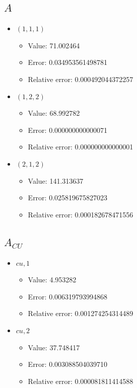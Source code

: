 \documentclass{article}%
\begin{document}
\subsection{$A$}%
\begin{itemize}%
	\item $(1, 1, 1)$%
	\begin{itemize}%
		\item Value: 71.002464%
		\item Error: 0.034953561498781%
		\item Relative error: 0.000492044372257%
	\end{itemize}%
	\item $(1, 2, 2)$%
	\begin{itemize}%
		\item Value: 68.992782%
		\item Error: 0.000000000000071%
		\item Relative error: 0.000000000000001%
	\end{itemize}%
	\item $(2, 1, 2)$%
	\begin{itemize}%
		\item Value: 141.313637%
		\item Error: 0.025819675827023%
		\item Relative error: 0.000182678471556%
	\end{itemize}%
\end{itemize}%
\subsection{$A_{CU}$}%
\begin{itemize}%
	\item $\textit{cu},1$%
	\begin{itemize}%
		\item Value: 4.953282%
		\item Error: 0.006319793994868%
		\item Relative error: 0.001274254314489%
	\end{itemize}%
	\item $\textit{cu},2$%
	\begin{itemize}%
		\item Value: 37.748417%
		\item Error: 0.003088504039710%
		\item Relative error: 0.000081811414588%
	\end{itemize}%
\end{itemize}%
\end{document}
